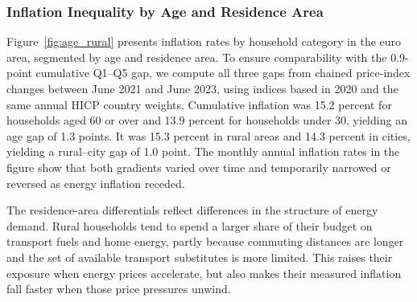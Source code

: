 \documentclass[11pt]{article}
\begin{document}
\subsubsection{Inflation Inequality by Age and Residence Area}


Figure~\ref{fig:age_rural} presents inflation rates by household category in the euro area,
segmented by age and residence area. To ensure comparability with the 0.9-point cumulative Q1--Q5
gap, we compute all three gaps from chained price-index changes between June 2021 and June 2023,
using indices based in 2020 and the same annual HICP country weights. Cumulative inflation was 15.2
percent for households aged 60 or over and 13.9 percent for households under 30, yielding an age gap
of 1.3 points. It was 15.3 percent in rural areas and 14.3 percent in cities, yielding a rural--city
gap of 1.0 point. The monthly annual inflation rates in the figure show that both gradients varied
over time and temporarily narrowed or reversed as energy inflation receded.

The residence-area differentials reflect differences in the structure of
energy demand. Rural households tend to spend a larger share of their budget on transport fuels and
home energy, partly because commuting distances are longer and the set of available transport
substitutes is more limited. This raises their exposure when energy prices accelerate, but also makes
their measured inflation fall faster when those price pressures unwind.
\end{document}
